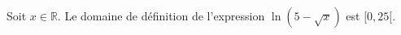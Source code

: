 Soit $x\in \mathbb R$. Le domaine de définition de l'expression $\ln(5-\sqrt  x)$ est $[0,25[$.

\begin{reponses}
\end{reponses}

